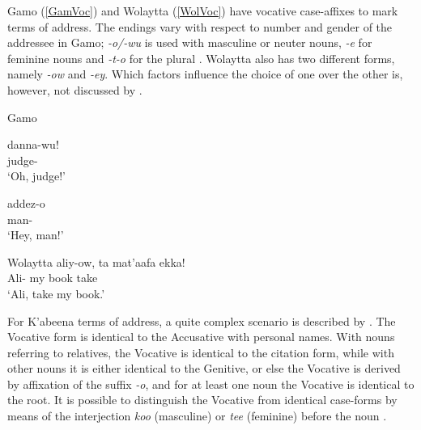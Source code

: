 
Gamo (\ref{GamVoc}) and Wolaytta (\ref{WolVoc}) have vocative case-affixes to mark terms of address. 
The endings vary with respect to number and gender of the addressee in Gamo;  \emph{-o/-wu} is used with masculine or neuter nouns, \emph{-e} for feminine nouns and \emph{-t-o} for the plural \citep[382--383]{Hompo:1990}.
Wolaytta also has two different forms, namely \emph{-ow} and \emph{-ey}. 
Which factors influence the choice of one over the other is, however, not discussed by \citet[66]{Lamberti:1997}.

\begin{exe}\ex\label{GamVoc} {Gamo} \citep[282, 283]{Hompo:1990}\nopagebreak[4]
\begin{xlist}
\ex\gll danna-wu!\\
judge-\voc{}\\
`Oh, judge!'

\ex\gll addez-o\\
man-\voc{}\\
`Hey, man!'
\end{xlist}
\end{exe}

\begin{exe}\ex\label{WolVoc} {Wolaytta} \citep[209]{Lamberti:1997}\nopagebreak[4]
\gll aliy-ow, ta mat'aafa ekka!\\
Ali-\voc{} my book take\\
`Ali, take my book.'
\end{exe}

For K'abeena terms of address, a quite complex scenario is described by \citet{Crass:2005}.
The Vocative form is identical to the {Accusative} with personal names.
With nouns referring to relatives, the {Vocative} is identical to the citation form, while with other nouns it is either identical to the {Genitive}, or else the Vocative is derived by affixation of the suffix \emph{-o}, and for at least one noun the {Vocative} is identical to the root. 
It is possible to distinguish the {Vocative} from identical case-forms by means of the interjection \emph{koo} (masculine) or \emph{tee}  (feminine) before the noun  \citep[95--96]{Crass:2005}. 

